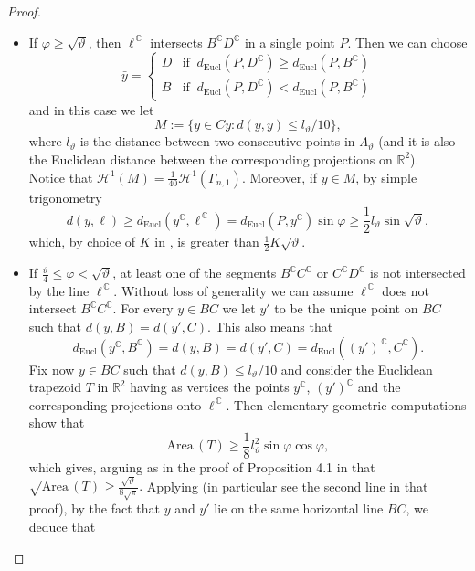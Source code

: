 \documentclass[12pt]{amsart}
\newcommand{\R}{\mathbb R}
\newcommand{\C}{\mathbb C}
\renewcommand{\theta}{\vartheta}
\numberwithin{equation}{section}
\theoremstyle{plain}
\theoremstyle{definition}
\theoremstyle{remark}
\begin{document}
\begin{proof}
\begin{itemize}
    \item If $\varphi\geq \sqrt\theta$, then $\ell^{\,\C}$ intersects $B^\C D^\C$ in a single point $P$. Then we can choose
    \[\bar y=\begin{cases}
        D &  \text{if }\ d_{\mathrm{Eucl}}(P, D^\C)\geq d_{\mathrm{Eucl}}(P, B^\C)\\ B & \text{if }\ d_{\mathrm{Eucl}}(P, D^\C)< d_{\mathrm{Eucl}}(P, B^\C)
    \end{cases} \]
    and in this case we let \begin{equation*}\label{eq:DefM}M:=\{y\in C\bar y:d(y,\bar y)\leq l_\theta/10\},\end{equation*}
    where $l_\theta$ is the distance between two consecutive points in $\Lambda_\theta$ (and it is also the Euclidean distance between the corresponding projections on $\R^2$).\\ Notice that $\mathcal H^1(M)=\frac{1}{40}\mathcal H^1(\Gamma_{n,1}).$ 
    Moreover, if $y\in M$, by simple trigonometry
    \[d(y,\ell)\geq d_{\mathrm{Eucl}}(y^\C, \ell^{\,\C})=d_{\mathrm{Eucl}}(P,y^\C)\sin\varphi\geq \frac{1}{2}l_\theta\sin \sqrt\theta,\]
    which, by choice of $K$ in \cite[Proposition 4.1]{Juillet}, is greater than $\frac{1}{2}K\sqrt{\theta}$.
    \item If $\frac{\theta}{4}\leq \varphi<\sqrt\theta$, at least one of the segments $B^\C C^\C$ or $C^\C D^\C$ is not intersected by the line $\ell ^{\,\C}$. Without loss of generality we can assume $\ell^{\,\C}$ does not intersect $B^\C C^\C$. %
    For every $y\in BC$ %
    we let $y'$ to be the unique point on $BC$ such that $d(y,B)=d(y',C)$. This also means that \[d_{\mathrm{Eucl}}(y^\C,B^\C)=d(y,B)=d(y',C)=d_{\mathrm{Eucl}}((y')^{\,\C},C^\C).\]
    Fix now $y\in BC$ such that $d(y,B)\leq l_\theta/10$ and consider the Euclidean trapezoid $T$ in $\R^2$ having as vertices the points $y^\C$, $(y')^\C$ and the corresponding projections onto $\ell^{\,\C}$. %
    Then elementary geometric computations show that
    \[\text{Area}\,(T)\geq\frac{1}{8}l_\theta^2\sin\varphi\cos\varphi,\]
    which gives, arguing as in the proof of Proposition 4.1 in \cite{Juillet} that $\sqrt{\text{Area}\,(T)}\geq \frac{\sqrt \theta}{8\sqrt\pi}.$
    Applying \cite[Lemma 2.5]{Juillet} (in particular see the second line in that proof), by the fact that $y$ and $y'$ lie on the same horizontal line $BC$, we deduce that

\end{itemize}
\end{proof}
\end{document}
